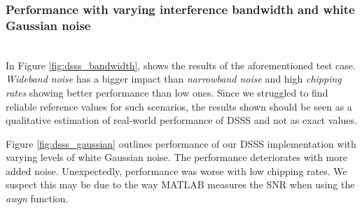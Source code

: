 		
		\subsubsection{Performance with varying interference bandwidth and white Gaussian noise}~\\
			In Figure \ref{fig:dsss_bandwidth}, shows the results of the aforementioned test case.
			\emph{Wideband noise} has a bigger impact than \emph{narrowband noise} and high \emph{chipping rates} showing better performance than low ones.
			Since we struggled to find reliable reference values for such scenarios, the results shown should be seen as a qualitative estimation of real-world performance of DSSS and not as exact values. 
			
			Figure \ref{fig:dsss_gaussian} outlines performance of our DSSS implementation with varying levels of white Gaussian noise.
			The performance deteriorates with more added noise.
			Unexpectedly, performance was worse with low chipping rates.
			We suspect this may be due to the way MATLAB measures the SNR when using the \emph{awgn} function.
			
